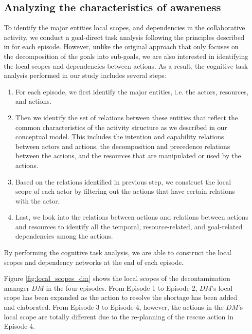 \subsection{Analyzing the characteristics of awareness} %
\label{sub:analyzing_the_characteristics_of_awareness}
To identify the major entities local scopes, and dependencies in the collaborative activity, we conduct a goal-direct task analysis following the principles described in \cite{endsley2000direct} for each episode. However, unlike the original approach that only focuses on the decomposition of the goals into sub-goals, we are also interested in identifying the local scopes and dependencies between actions. As a result, the cognitive task analysis performed in our study includes several steps:

\begin{enumerate}
	\item For each episode, we first identify the major entities, i.e. the actors, resources, and actions.
	\item Then we identify the set of relations between these entities that reflect the common characteristics of the activity structure as we described in our conceptual model. This includes the intention and capability relations between actors and actions, the decomposition and precedence relations between the actions, and the resources that are manipulated or used by the actions.
	\item Based on the relations identified in previous step, we construct the local scope of each actor by filtering out the actions that have certain relations with the actor.
	\item Last, we look into the relations between actions and relations between actions and resources to identify all the temporal, resource-related, and goal-related dependencies among the actions.
\end{enumerate}

By performing the cognitive task analysis, we are able to construct the local scopes and dependency networks at the end of each episode. 

Figure \ref{fig:local_scopes_dm} shows the local scopes of the decontamination manager $DM$ in the four episodes. From Episode 1 to Episode 2, $DM$'s local scope has been expanded as the action to resolve the shortage has been added and elaborated. From Episode 3 to Episode 4, however, the actions in the $DM$'s local scope are totally different due to the re-planning of the rescue action in Episode 4.

